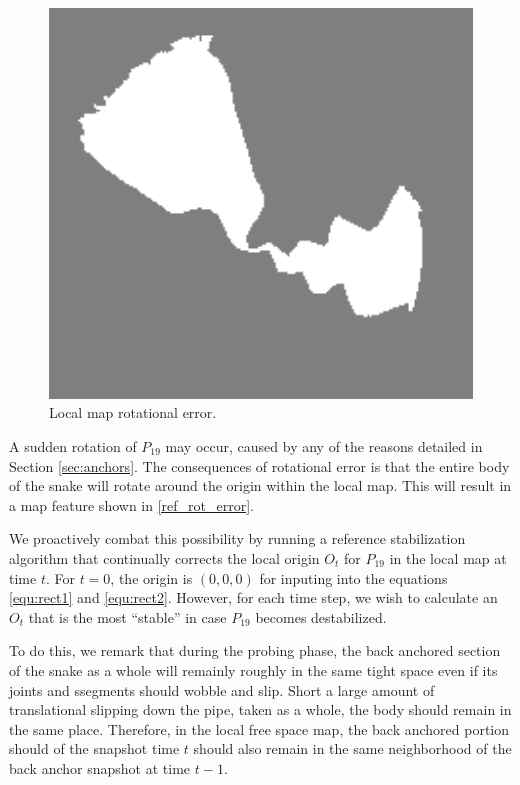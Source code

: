 \begin{figure}[htbp]
\centering
\includegraphics[keepaspectratio,width=400pt,height=0.75\textheight]{localMapError.png}
\caption{Local map rotational error.}
\label{ref_rot_error}
\end{figure}


A sudden rotation of $P_{19}$ may occur, caused by any of the reasons detailed in Section \autoref{sec:anchors}. The consequences of rotational error is that the entire body of the snake will rotate around the origin within the local map. This will result in a map feature shown in \autoref{ref_rot_error}.

We proactively combat this possibility by running a reference stabilization algorithm that continually corrects the local origin $O_t$ for $P_{19}$ in the local map at time $t$. For $t=0$, the origin is $(0,0,0)$ for inputing into the equations \autoref{equ:rect1} and \autoref{equ:rect2}. However, for each time step, we wish to calculate an $O_t$ that is the most ``stable'' in case $P_{19}$ becomes destabilized.

To do this, we remark that during the probing phase, the back anchored section of the snake as a whole will remainly roughly in the same tight space even if its joints and ssegments should wobble and slip. Short a large amount of translational slipping down the pipe, taken as a whole, the body should remain in the same place. Therefore, in the local free space map, the back anchored portion should of the snapshot time $t$ should also remain in the same neighborhood of the back anchor snapshot at time $t-1$. 

